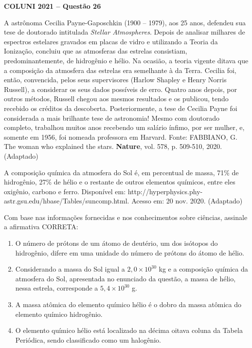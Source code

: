 \textbf{COLUNI 2021 -- Questão 26}\par\medskip A astrônoma Cecilia Payne-Gaposchkin (1900 – 1979), aos 25 anos, defendeu sua tese de doutorado intitulada \textit{Stellar Atmospheres}. Depois de analisar milhares de espectros estelares gravados em placas de vidro e utilizando a Teoria da Ionização, concluiu que as atmosferas das estrelas consistiam, predominantemente, de hidrogênio e hélio. Na ocasião, a teoria vigente ditava que a composição da atmosfera das estrelas era semelhante à da Terra. Cecilia foi, então, convencida, pelos seus supervisores (Harlow Shapley e Henry Norris Russell), a considerar os seus dados possíveis de erro. Quatro anos depois, por outros métodos, Russell chegou aos mesmos resultados e os publicou, tendo recebido os créditos da descoberta. Posteriormente, a tese de Cecilia Payne foi considerada a mais brilhante tese de astronomia! Mesmo com doutorado completo, trabalhou muitos anos recebendo um salário ínfimo, por ser mulher, e, somente em 1956, foi nomeada professora em Harvard. Fonte: FABBIANO, G. The woman who explained the stars. \textbf{Nature}, vol. 578, p. 509-510, 2020. (Adaptado)

\par

A composição química da atmosfera do Sol é, em percentual de massa, 71\% de hidrogênio, 27\% de hélio e o restante de outros elementos químicos, entre eles oxigênio, carbono e ferro. Disponível em: http://hyperphysics.phy-astr.gsu.edu/hbase/Tables/suncomp.html. Acesso em: 20 nov. 2020. (Adaptado)

\par

Com base nas informações fornecidas e nos conhecimentos sobre ciências, assinale a afirmativa CORRETA:\begin{enumerate}
\item O número de prótons de um átomo de deutério, um dos isótopos do hidrogênio, difere em uma unidade do
        número de prótons do átomo de hélio.
\item Considerando a massa do Sol igual a $2{,}0 \times 10^{30}$ kg e a composição química da atmosfera do Sol,
        apresentada no enunciado da questão, a massa de hélio, nessa estrela, corresponde a $5{,}4 \times 10^{30}$ g.
\item A massa atômica do elemento químico hélio é o dobro da massa atômica do elemento químico hidrogênio.
\item O elemento químico hélio está localizado na décima oitava coluna da Tabela Periódica, sendo classificado
        como um halogênio.\end{enumerate}
